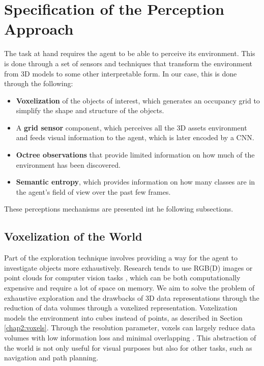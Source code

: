 \section{Specification of the Perception Approach}
The task at hand requires the agent to be able to perceive its environment. This is done through a set of sensors and techniques that transform the environment from 3D models to some other interpretable form. In our case, this is done through the following:
\begin{itemize}
    \item \textbf{Voxelization} of the objects of interest, which generates an occupancy grid to simplify the shape and structure of the objects.
    \item A \textbf{grid sensor} component, which perceives all the 3D assets environment and feeds visual information to the agent, which is later encoded by a CNN.
    \item \textbf{Octree observations} that provide limited information on how much of the environment has been discovered.
    \item \textbf{Semantic entropy}, which provides information on how many classes are in the agent's field of view over the past few frames.
\end{itemize}
These perceptions mechanisms are presented int he following subsections.

\subsection{Voxelization of the World}
Part of the exploration technique involves providing a way for the agent to investigate objects more exhaustively. Research tends to use RGB(D) images or point clouds for computer vision tasks \cite{xie2020linking, huang2021comprehensive}, which can be both computationally expensive and require a lot of space on memory.
We aim to solve the problem of exhaustive exploration and the drawbacks of 3D data representations through the reduction of data volumes through a voxelized representation. Voxelization models the environment into cubes instead of points, as described in Section \ref{chap2:voxels}. Through the resolution parameter, voxels can largely reduce data volumes with low information loss and minimal overlapping \cite{xie2020linking}. This abstraction of the world is not only useful for visual purposes but also for other tasks, such as navigation and path planning.


